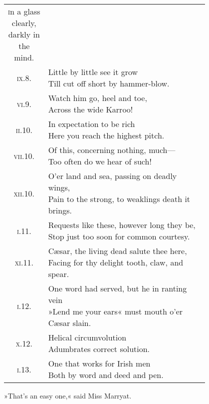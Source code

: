\begin{longtable} {c p{0.8\linewidth}}
{\textsc{i}n a glass clearly, darkly in the mind.}\\
\textsc{ix.8.} &  \makecell[l]{Little by little see it grow\\
Till cut off short by hammer-blow.}\\
\textsc{vi.9.} &  \makecell[l]{Watch him go, heel and toe,\\
Across the wide Karroo!}\\
\textsc{ii.10.} &  \makecell[l]{In expectation to be rich\\
Here you reach the highest pitch.}\\
\textsc{vii.10.} &  \makecell[l]{Of this, concerning nothing, much—\\
Too often do we hear of such!}\\
\textsc{xii.10.} &  \makecell[l]{O'er land and sea, passing on deadly wings,\\
Pain to the strong, to weaklings death it brings.}\\
\textsc{i.11.} &  \makecell[l]{Requests like these, however long they be,\\
Stop just too soon for common courtesy.}\\
\textsc{xi.11.} &  \makecell[l]{Cæsar, the living dead salute thee here,\\
Facing for thy delight tooth, claw, and spear.}\\
\textsc{i.12.} &  \makecell[l]{One word had served, but he in ranting vein\\
»Lend me your ears« must mouth o'er Cæsar slain.}\\
\textsc{x.12.} &  \makecell[l]{Helical circumvolution\\
Adumbrates correct solution.}\\
\textsc{i.13.} &  \makecell[l]{One that works for Irish men\\
Both by word and deed and pen.}\\
\end{longtable}

»That's an easy one,« said Miss Marryat.

